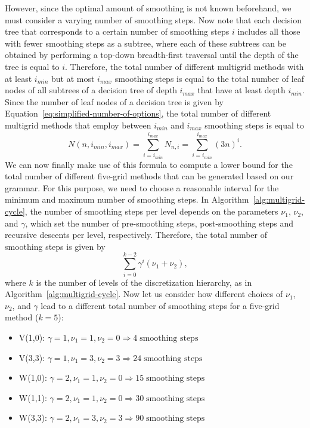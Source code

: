 However, since the optimal amount of smoothing is not known beforehand, we must consider a varying number of smoothing steps.
Now note that each decision tree that corresponds to a certain number of smoothing steps $i$ includes all those with fewer smoothing steps as a subtree, where each of these subtrees can be obtained by performing a top-down breadth-first traversal until the depth of the tree is equal to $i$.
Therefore, the total number of different multigrid methods with at least $i_{min}$ but at most $i_{max}$ smoothing steps is equal to the total number of leaf nodes of all subtrees of a decision tree of depth $i_{max}$ that have at least depth $i_{min}$.
Since the number of leaf nodes of a decision tree is given by Equation~\eqref{eq:simplified-number-of-options}, the total number of different multigrid methods that employ between $i_{min}$ and $i_{max}$ smoothing steps is equal to
\begin{equation}\tag{4.10}
	N(n, i_{min}, i_{max}) = \sum_{i = i_{min}}^{i_{max}} N_{n,i} = \sum_{i = i_{min}}^{i_{max}} (3 n)^i.
	\label{eq:search-space-estimation}
\end{equation}
We can now finally make use of this formula to compute a lower bound for the total number of different five-grid methods that can be generated based on our grammar.
For this purpose, we need to choose a reasonable interval for the minimum and maximum number of smoothing steps.
In Algorithm~\ref{alg:multigrid-cycle}, the number of smoothing steps per level depends on the parameters $\nu_1$, $\nu_2$, and $\gamma$, which set the number of pre-smoothing steps, post-smoothing steps and recursive descents per level, respectively.
Therefore, the total number of smoothing steps is given by
\begin{equation}\tag{4.11}
	\sum_{i = 0}^{k - 2} \gamma^i (\nu_1 + \nu_2),
\end{equation}
where $k$ is the number of levels of the discretization hierarchy, as in Algorithm~\ref{alg:multigrid-cycle}.
Now let us consider how different choices of $\nu_1$, $\nu_2$, and $\gamma$ lead to a different total number of smoothing steps for a five-grid method ($k = 5$):
\begin{itemize}
	\item V(1,0): $\gamma = 1, \nu_1 = 1, \nu_2 = 0 \Rightarrow 4 \; \text{smoothing steps}$
	\item V(3,3): $\gamma = 1, \nu_1 = 3, \nu_2 = 3 \Rightarrow 24 \; \text{smoothing steps}$
	\item W(1,0): $\gamma = 2, \nu_1 = 1, \nu_2 = 0 \Rightarrow 15 \; \text{smoothing steps}$
	\item W(1,1): $\gamma = 2, \nu_1 = 1, \nu_2 = 0 \Rightarrow 30 \; \text{smoothing steps}$
	\item W(3,3): $\gamma = 2, \nu_1 = 3, \nu_2 = 3 \Rightarrow 90 \; \text{smoothing steps}$
\end{itemize}
